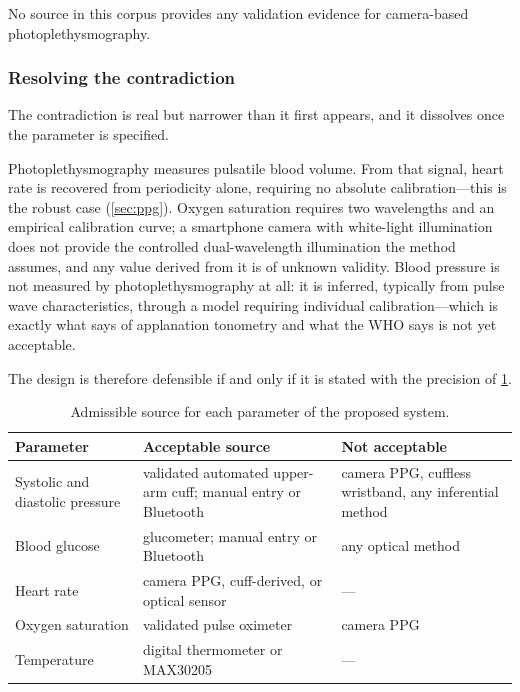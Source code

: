 \documentclass[12pt,a4paper,oneside]{report}
\begin{document}
No source in this corpus provides any validation evidence for camera-based photoplethysmography.

\subsubsection{Resolving the contradiction}\label{sec:contradiction}

The contradiction is real but narrower than it first appears, and it dissolves once the parameter is specified.

Photoplethysmography measures pulsatile blood volume. From that signal, heart rate is recovered from periodicity alone, requiring no absolute calibration---this is the robust case (\cref{sec:ppg}). Oxygen saturation requires two wavelengths and an empirical calibration curve; a smartphone camera with white-light illumination does not provide the controlled dual-wavelength illumination the method assumes, and any value derived from it is of unknown validity. Blood pressure is not measured by photoplethysmography at all: it is inferred, typically from pulse wave characteristics, through a model requiring individual calibration---which is exactly what \textcite{navarro2023} says of applanation tonometry and what the WHO says is not yet acceptable.

The design is therefore defensible if and only if it is stated with the precision of \cref{tab:param-sources}.

\begin{table}[htbp]
\centering\small
\caption{Admissible source for each parameter of the proposed system.}\label{tab:param-sources}
\begin{tabularx}{\textwidth}{@{}>{\raggedright\arraybackslash}p{3.6cm} >{\raggedright\arraybackslash}X >{\raggedright\arraybackslash}p{4.2cm}@{}}
\toprule
\textbf{Parameter} & \textbf{Acceptable source} & \textbf{Not acceptable} \\
\midrule
Systolic and diastolic pressure & validated automated upper-arm cuff; manual entry or Bluetooth & camera PPG, cuffless wristband, any inferential method \\
Blood glucose & glucometer; manual entry or Bluetooth & any optical method \\
Heart rate & camera PPG, cuff-derived, or optical sensor & --- \\
Oxygen saturation & validated pulse oximeter & camera PPG \\
Temperature & digital thermometer or MAX30205 & --- \\
\bottomrule
\end{tabularx}
\end{table}
\end{document}

